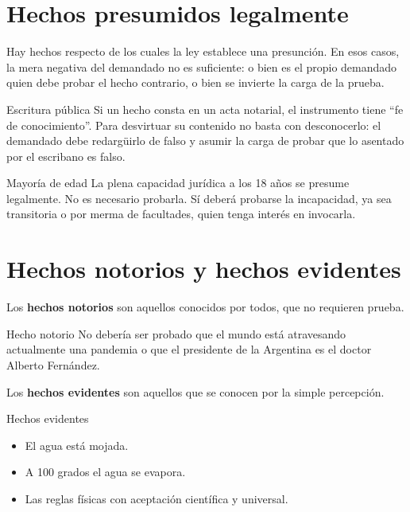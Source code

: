 \documentclass[12pt,oneside]{book}
\begin{document}
\section{Hechos presumidos legalmente}

Hay hechos respecto de los cuales la ley establece una presunción. En esos casos, la mera negativa del demandado no es suficiente: o bien es el propio demandado quien debe probar el hecho contrario, o bien se invierte la carga de la prueba.

\begin{example}{Escritura pública}
Si un hecho consta en un acta notarial, el instrumento tiene “fe de conocimiento”. Para desvirtuar su contenido no basta con desconocerlo: el demandado debe redargüirlo de falso y asumir la carga de probar que lo asentado por el escribano es falso.
\end{example}

\begin{example}{Mayoría de edad}
La plena capacidad jurídica a los 18 años se presume legalmente. No es necesario probarla. Sí deberá probarse la incapacidad, ya sea transitoria o por merma de facultades, quien tenga interés en invocarla.
\end{example}

\section{Hechos notorios y hechos evidentes}

Los \textbf{hechos notorios} son aquellos conocidos por todos, que no requieren prueba.

\begin{example}{Hecho notorio}
No debería ser probado que el mundo está atravesando actualmente una pandemia o que el presidente de la Argentina es el doctor Alberto Fernández.
\end{example}

Los \textbf{hechos evidentes} son aquellos que se conocen por la simple percepción.


\begin{example}{Hechos evidentes}
\begin{itemize}
    \item El agua está mojada.
    \item A 100 grados el agua se evapora.
    \item Las reglas físicas con aceptación científica y universal.
\end{itemize}
\end{example}
\end{document}
